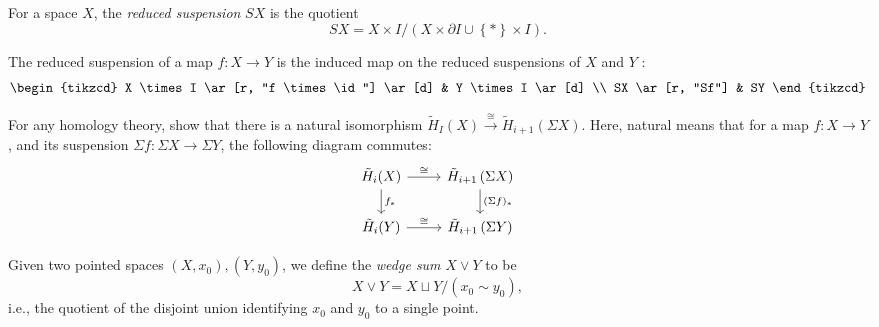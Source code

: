 \begin{definition}
    For a space $X$, the \textit{reduced suspension}
    $SX$ is the quotient
    \[
    SX = X \times I / \left( X \times \partial I
    \cup \left\{ * \right\} \times I \right) .
    \] 
\end{definition}

\begin{definition}
    The reduced suspension of a map $f \colon X \to Y$ is
    the induced map on the reduced suspensions of
    $X$ and $Y$ :
    \begin{equation*}
    \begin{tikzcd}
        X \times I \ar[r, "f \times \id"]
        \ar[d] & Y \times I \ar[d] \\
        SX \ar[r, "Sf"] & SY
    \end{tikzcd}
    \end{equation*}
    
\end{definition}

\begin{exercise}[]
    For any homology theory, show that
    there is a natural isomorphism
    $\tilde{H}_I (X) \stackrel{\cong}{\to} 
    \tilde{H}_{i+1} \left( \Sigma X \right) $. Here,
    natural means that for a map $f \colon X \to Y$,
    and its suspension $\Sigma f \colon \Sigma X \to 
    \Sigma Y$, the following diagram commutes:
    \begin{equation*}
    \begin{tikzcd}
        \tilde{H}_i (X) \ar[r, "\cong"] \ar[d, "f_*"]& 
        \tilde{H}_{i+1} \left( \Sigma X \right)
        \ar[d, "(\Sigma f)_*"] \\
        \tilde{H}_i (Y) \ar[r, "\cong"] & \tilde{H}_{i+1}
        \left( \Sigma Y \right) 
    \end{tikzcd}
    \end{equation*}
    
\end{exercise}


\begin{definition}
    Given two pointed spaces $(X, x_0), \left( Y, y_0 \right) $,
    we define
    the \textit{wedge sum}  $X \vee Y$ to be
    \[
    X \vee Y = X \sqcup Y / \left( x_0 \sim y_0 \right) ,
    \] 
    i.e., the quotient of the disjoint union identifying
    $x_0$ and $y_0$ to a single point.
\end{definition}

